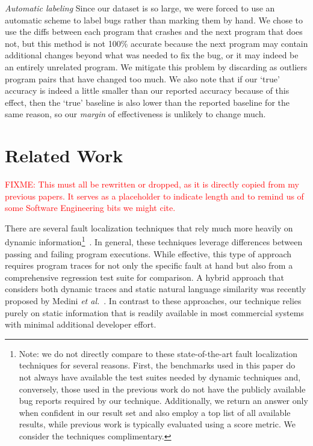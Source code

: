 \documentclass[conference]{IEEEtran}
\newcommand{\fixme}[1]{\textcolor{red}{FIXME: #1}}
\begin{document}
\emph{Automatic labeling} Since our dataset is so large, we were forced to use an automatic
scheme to label bugs rather than marking them by hand. We chose to use the diffs
between each program that crashes and the next program that does not, but this method
is not 100\% accurate because the next program may contain additional changes
beyond what was needed to fix the bug, or it may indeed be an entirely unrelated
program. We mitigate this problem by discarding as outliers program pairs that have
changed too much. We also note that if our `true' accuracy is indeed a little
smaller than our reported accuracy because of this effect, then the `true' baseline
is also lower than the reported baseline for the same reason, so our
\emph{margin} of effectiveness is unlikely to change much.

\section{Related Work}
\fixme{This must all be rewritten or dropped, as it is directly copied from
my previous papers. It serves as a placeholder to indicate length and to
remind us of some Software Engineering bits we might cite.}

There are several fault localization techniques that rely much more heavily
on dynamic information\footnote{Note: we do not directly compare to these
state-of-the-art fault localization techniques for several reasons.  First,
the benchmarks used in this paper do not always have available the test
suites needed by dynamic techniques and, conversely, those used in the
previous work do not have the publicly available bug reports required
by our technique.  Additionally, we return an answer only when confident in
our result set and also employ a top list of all available results, while
previous work is typically evaluated using a score metric.  We consider the
techniques complimentary.}~\cite
{harrold05,Renieris03,cleve05,wang09}.
In general,
these techniques leverage differences between passing and failing program
executions.  While effective, this type of approach requires program traces
for not only the specific fault at hand but also from a comprehensive regression
test suite for comparison.
A hybrid approach that considers both dynamic
traces and static natural language similarity was recently proposed by
Medini \textit{et al.}~\cite{Medini11}.
In contrast to these approaches, our technique relies purely on static
information that is readily available in most commercial systems with minimal
additional developer effort.
\end{document}
